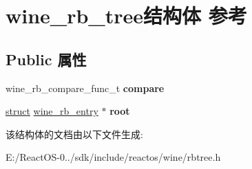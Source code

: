\hypertarget{structwine__rb__tree}{}\section{wine\+\_\+rb\+\_\+tree结构体 参考}
\label{structwine__rb__tree}
\subsection*{Public 属性}
\begin{DoxyCompactItemize}
\item 
\mbox{\label{structwine__rb__tree_aa750629525c9c7fb920ce1f2282f3a0f}} 
wine\+\_\+rb\+\_\+compare\+\_\+func\+\_\+t {\bfseries compare}
\item 
\mbox{\label{structwine__rb__tree_a67bda7fa5a93127da4789d64c1222fae}} 
\hyperlink{interfacestruct}{struct} \hyperlink{structwine__rb__entry}{wine\+\_\+rb\+\_\+entry} $\ast$ {\bfseries root}
\end{DoxyCompactItemize}


该结构体的文档由以下文件生成\+:\begin{DoxyCompactItemize}
\item 
E\+:/\+React\+O\+S-\/0../sdk/include/reactos/wine/rbtree.\+h\end{DoxyCompactItemize}
